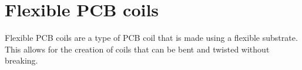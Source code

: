 \section{Flexible PCB coils}
Flexible PCB coils are a type of PCB coil that is made using a flexible substrate. This allows for the creation of coils that can be bent and twisted without breaking.





